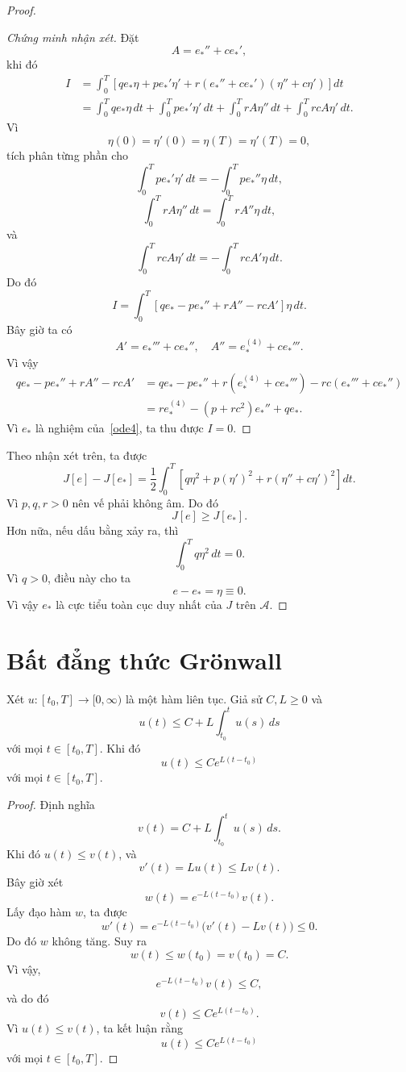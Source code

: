 ﻿\documentclass[12pt]{article}
\begin{document}
\begin{proof}
\begin{proof}[Chứng minh nhận xét]
Đặt
\[
 A = e_*'' + ce_*',
\]
khi đó
\begin{align*}
 I
 & = \int_0^T
 \left[
 qe_*\eta
 +
 pe_*'\eta'
 +
 r(e_*'' + ce_*')(\eta'' + c\eta')
 \right]dt\\
 & = \int_0^T qe_*\eta\, dt
 + \int_0^T pe_*'\eta'\, dt
 + \int_0^T rA\eta''\, dt
 + \int_0^T rcA\eta'\, dt.
\end{align*}
Vì
\[
 \eta(0) = \eta'(0) = \eta(T) = \eta'(T) = 0,
\]
tích phân từng phần cho
\[ \int_0^T pe_*'\eta'\, dt = - \int_0^T pe_*''\eta\, dt,
\]
\[ \int_0^T rA\eta''\, dt = \int_0^T rA''\eta\, dt,
\]
và
\[ \int_0^T rcA\eta'\, dt = - \int_0^T rcA'\eta\, dt.
\]
Do đó
\[
 I = \int_0^T \left[ qe_* - pe_*'' + rA'' - rcA' \right]\eta\, dt.
\]
Bây giờ ta có
\[
 A' = e_*''' + ce_*'',\quad A'' = e_*^{(4)} + ce_*'''.
\]
Vì vậy
\begin{align*}
 qe_*
 -
 pe_*''
 +
 rA''
 -
 rcA'
 & =
 qe_*
 -
 pe_*''
 +
 r(e_*^{(4)} + ce_*''')
 -
 rc(e_*''' + ce_*'')\\
 & =
 re_*^{(4)}
 -
 (p + rc^2)e_*''
 +
 qe_*.
\end{align*}
Vì $e_*$ là nghiệm của~\eqref{ode4}, ta thu được $I = 0.$
\end{proof}
Theo nhận xét trên, ta được
\[
 J[e] - J[e_*] = \frac{1}{2} \int_0^T \left[ q\eta^2 + p(\eta')^2 + r(\eta'' + c\eta')^2 \right]dt.
\]
Vì $p, q, r > 0$ nên vế phải không âm. Do đó
\[
 J[e] \geq J[e_*].
\]
Hơn nữa, nếu dấu bằng xảy ra, thì
\[ \int_0^T q\eta^2\, dt = 0.
\]
Vì $q > 0$, điều này cho ta 
\[
 e - e_* = \eta\equiv 0.
\]
Vì vậy $e_*$ là cực tiểu toàn cục duy nhất của $J$ trên $\mathcal A$.
\end{proof}
\section{Bất đẳng thức Grönwall}
\begin{theorem}\label{gronwall}
Xét $u:[t_0, T] \to [0, \infty)$ là một hàm liên tục.
Giả sử $C, L\ge 0$ và
\[
 u(t)\le C + L \int_{t_0}^{t}u(s)\, ds
\]
với mọi $t \in [t_0, T]$. Khi đó
\[
 u(t)\le Ce^{L(t - t_0)}
\]
với mọi $t \in [t_0, T]$.
\end{theorem}

\begin{proof}
Định nghĩa
\[
 v(t) = C + L \int_{t_0}^{t}u(s)\, ds.
\]
Khi đó $u(t)\le v(t)$, và
\[
 v'(t) = Lu(t)\le Lv(t).
\]
Bây giờ xét
\[
 w(t) = e^{-L(t - t_0)}v(t).
\]
Lấy đạo hàm $w$, ta được
\[
 w'(t)
 =
 e^{-L(t - t_0)}\bigl(v'(t) - Lv(t)\bigr)
 \le 0.
\]
Do đó $w$ không tăng. Suy ra
\[
 w(t)\le w(t_0) = v(t_0) = C.
\]
Vì vậy,
\[
 e^{-L(t - t_0)}v(t)\le C,
\]
và do đó
\[
 v(t)\le Ce^{L(t - t_0)}.
\]
Vì $u(t)\le v(t)$, ta kết luận rằng
\[
 u(t)\le Ce^{L(t - t_0)}
\]
với mọi $t \in [t_0, T]$.
\end{proof}
\end{document}
